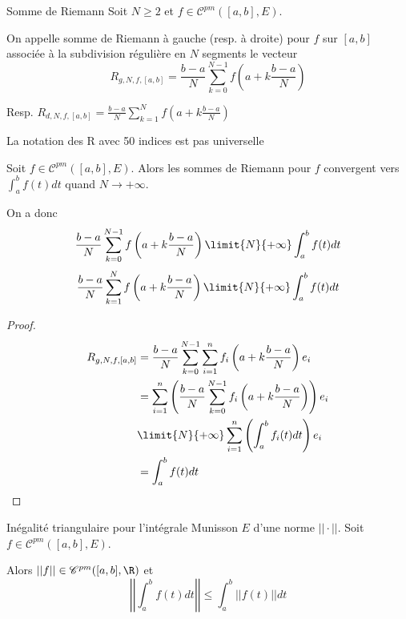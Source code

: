 \begin{definition}{Somme de Riemann}{}
    Soit $N \geqslant 2$ et $f \in \mathscr C^{pm}([a, b], E)$.

    On appelle somme de Riemann à gauche (resp. à droite) pour $f$ sur $[a, b]$ associée à la 
    subdivision régulière en $N$ segments le vecteur 
    $$R_{g, N, f, [a, b]} = \frac{b-a} N \sum_{k=0}^{N-1} f\left( a + k \frac{b-a}{N} \right)$$

    Resp. $\displaystyle R_{d, N, f, [a, b]} = \frac{b-a} N \sum_{k=1}^{N} f\left( a + k \frac{b-a}{N} \right)$
\end{definition}

\begin{remarque}
    La notation des R avec 50 indices est pas universelle
\end{remarque}

\begin{proposition}{}{}
    Soit $f \in \mathscr C^{pm}([a, b], E)$. Alors les sommes de Riemann pour $f$ convergent vers 
    $\displaystyle \int_a^b f(t) dt$ quand $N \to +\infty$.

    On a donc 
    $$ \frac{b - a }{N } \sum_{k = 0 }^{N - 1 } f\left( a + k \frac{b - a } N \right) \limit{N}{+ \infty} \int_a^b f(t) dt$$
    $$ \frac{b - a }{N } \sum_{k = 1 }^{N} f\left( a + k \frac{b - a } N \right) \limit{N}{+ \infty} \int_a^b f(t) dt$$

\end{proposition}


\begin{proof}
    \begin{align*}
        R_{g, N, f, [a, b]} & = \frac{b - a }{N } \sum_{k = 0 }^{N - 1 } \sum_{i = 1 }^{n } f_i\left( a + k \frac{b - a } N \right) e_i \\
        & = \sum_{i = 1 }^{n } \left( \frac{b - a }{N } \sum_{k = 0 }^{N - 1 } f_i\left( a + k \frac{b - a } N \right) \right) e_i \\
        & \limit{N}{+ \infty} \sum_{i = 1 }^{n } \left( \int_a^b f_i(t) dt \right) e_i \\
        & = \int_a^b f(t) dt
    \end{align*}
\end{proof}

\begin{theoreme}{Inégalité triangulaire pour l'intégrale}{}
    Munisson $E$ d'une norme $||\cdot||$. Soit $f \in \mathscr C^{pm}([a, b], E)$.
    
    Alors $||f|| \in \mathscr C^{pm}([a, b], \R)$ et
    $$\left|\left| \int_a^b f(t) dt \right|\right| \leqslant \int_a^b ||f(t)|| dt$$
\end{theoreme}


